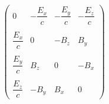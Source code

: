 \documentclass[preview]{standalone}
\begin{document}
\begin{align*}
\begin{pmatrix} 0 & - \dfrac{E_{x}}{c} & - \dfrac{E_{y}}{c} & - \dfrac{E_{z}}{c} \\ \
                          &&& \\ \dfrac{E_{x}}{c} & 0 & - B_{z} & B_{y} \\ \
                          &&& \\ \dfrac{E_{y}}{c} &  B_{z} & 0 & - B_{x} \\ &&& \\ \dfrac{E_{z}}{c} &  -B_{y} & B_{x} & 0 \end{pmatrix}
\end{align*}
\end{document}
